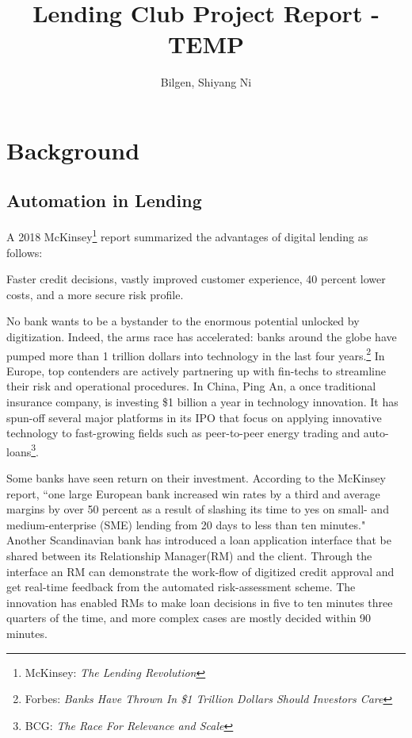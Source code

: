 \documentclass[11pt, twocolumn]{article}
\title{Lending Club Project Report - TEMP}
\author{Bilgen, Shiyang Ni}
\begin{document}
\maketitle

\section{Background}

\subsection{Automation in Lending}

A 2018 McKinsey\footnote{McKinsey: \textit{The Lending Revolution} } report summarized the advantages of digital lending as follows:
\begin{displayquote}
Faster credit decisions, vastly improved customer experience, 40 percent lower costs, and a more secure risk profile.
\end{displayquote}

No bank wants to be a bystander to the enormous potential unlocked by digitization. Indeed, the arms race has accelerated: banks around the globe have pumped more than 1 trillion dollars into technology in the last four years.\footnote{Forbes: \textit{Banks Have Thrown In \$1 Trillion Dollars Should Investors Care}} In Europe, top contenders are actively partnering up with fin-techs to streamline their risk and operational procedures. In China, Ping An, a once traditional insurance company, is investing \$1 billion a year in technology innovation. It has spun-off several major platforms in its IPO that focus on applying innovative technology to fast-growing fields such as peer-to-peer energy trading and auto-loans\footnote{BCG: \textit{The Race For
Relevance and Scale}}.  

Some banks have seen return on their investment. According to the McKinsey report, ``one large European bank increased win rates by a third and average margins by over 50 percent as a result of slashing its time to yes on small- and medium-enterprise (SME) lending from 20 days to less than ten minutes." Another Scandinavian bank has introduced a loan application interface that be shared between its Relationship Manager(RM) and the client. Through the interface an RM can demonstrate the work-flow of digitized credit approval and get real-time feedback from the automated risk-assessment scheme. The innovation has enabled RMs to make loan decisions in five to ten minutes three quarters of the time, and more complex cases are mostly decided within 90 minutes. 
\end{document}
